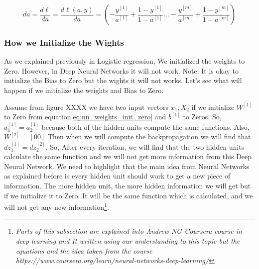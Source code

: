  \begin{equation}\label{eq:logistic_regression_derivatives_da_vectorize}
      da =  \frac{d\ell}{da} = \frac{d\ell(a,y)}{da} = (- \frac{y^{[1]}}{a^{[1]}} + \frac{1-y^{[1]}}{1-a^{[1]}} \ldots - \frac{y^{[m]}}{a^{[m]}} + \frac{1-y^{[m]}}{1-a^{[m]}} )
  \end{equation}
   
\newpage
\subsubsection{How we Initialize the Wights}

    As we explained previously in Logistic regression, We initialized the weights to Zero. However, in Deep Neural Networks it will not work. Note: It is okay to initialize the Bias to Zero but the wights it will not works. Let's see what will happen if we initialize the weights and Bias to Zero.
 
  Assume from figure XXXX we have two input vectors $x_1,X_2$ if we initialize $W^{[1]}$ to Zero from equation\eqref{eq:nn_weights_init_zero} and $b^{[1]}$ to Zeros. So, $a_1^{[1]}=a_2^{[1]}$ because both of the hidden units compute the same functions. Also, $W^{[2]}=[0 0]$ Then when we will compute the backpropagation we will find that $dz_1^{[1]}=dz_2^{[2]}$. So, After every iteration, we will find that the two hidden units calculate the same function and we will not get more information from this Deep Neural Network. We need to highlight that the main idea from Neural Networks as explained before is every hidden unit should work to get a new piece of information. The more hidden unit, the more hidden information we will get but if we initialize it to Zero. It will be the same function which is calculated, and we will not get any new information\footnote{\textit{Parts of this subsection are explained into Andrew NG Coursera course in deep learning and It written using our understanding to this topic but the equations and the idea taken from the course  https://www.coursera.org/learn/neural-networks-deep-learning/}}.

